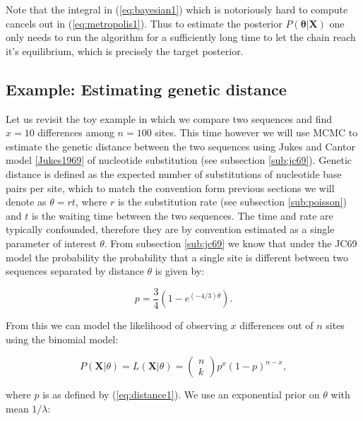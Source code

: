 \documentclass[12pt,twoside]{mitthesis}
\theoremstyle{plain}
\theoremstyle{definition}
\theoremstyle{remark}
\begin{document}
Note that the integral in (\ref{eq:bayesian1}) which is notoriously hard to compute cancels out in (\ref{eq:metropolis1}).
Thus to estimate the posterior $P\left(\mathbf{\theta}|\mathbf{X}\right)$ one only needs to run the algorithm for a sufficiently long time to let the chain reach it's equilibrium, which is precisely the target posterior.


\subsection{Example: Estimating genetic distance}

Let us revisit the toy example in which we compare two sequences and find $x=10$ differences among $n=100$ sites.
This time however we will use MCMC to estimate the genetic distance between the two sequences using Jukes and Cantor model \ref{Jukes1969} of nucleotide substitution (see subsection \ref{sub:jc69}).
Genetic distance is defined as the expected number of substitutions of nucleotide base pairs per site, which to match the convention form previous sections we will denote as $\theta=rt$, where $r$ is the substitution rate (see subsection \ref{sub:poisson}) and $t$ is the waiting time between the two sequences.
The time and rate are typically confounded, therefore they are by convention estimated as a single parameter of interest $\theta$.
From subsection \ref{sub:jc69} we know that under the JC69 model the probability the probability that a single site is different between two sequences separated by distance $\theta$ is given by:

\begin{equation}
p=\frac{3}{4}\left(1-e^{\left(-4/3\right)\theta}\right).
\label{eq:distance1}
\end{equation}

\noindent
From this we can model the likelihood of observing $x$ differences out of $n$ sites using the binomial model:

\begin{equation}
P\left(\mathbf{X}|\theta\right)=L\left(\mathbf{X}|\theta\right)=\left(\begin{array}{c}
n\\
k
\end{array}\right)p^{x}(1-p)^{n-x},
\label{eq:likelihood1}
\end{equation}

\noindent
where $p$ is as defined by (\ref{eq:distance1}).
We use an exponential prior on $\theta$ with mean $1/\lambda$:
\end{document}

